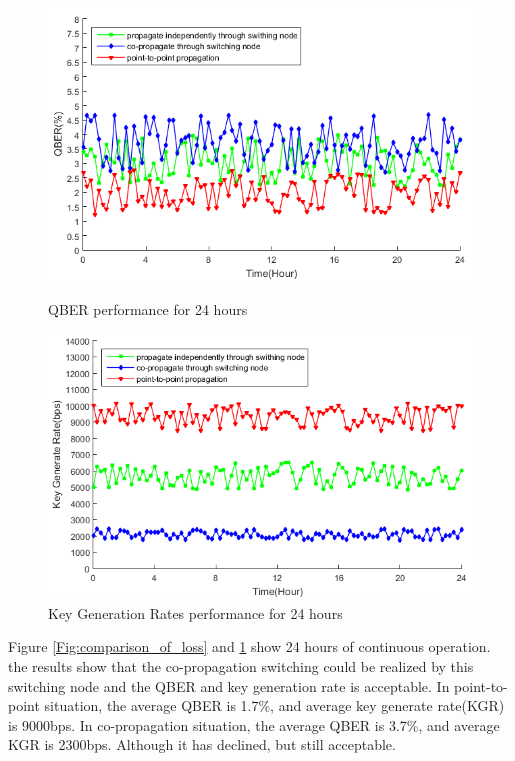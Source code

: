 \documentclass[letterpaper,10pt]{article}
\begin{document}
\begin{figure}[!htb]
   \begin{minipage}{0.48\textwidth}
     \centering
     \includegraphics[width=.9\linewidth]{qber_experiment}
     \caption{QBER performance for 24 hours} \label{Fig:comparison_of_loss}
   \end{minipage}\hfill
   \begin{minipage}{0.48\textwidth}
     \centering
     \includegraphics[width=.9\linewidth]{key_rate_experiment}
     \caption{Key Generation Rates performance for 24 hours} \label{Fig:comparison_of_rate}
   \end{minipage}
\end{figure}
Figure \ref{Fig:comparison_of_loss} and \ref{Fig:comparison_of_rate} show 24 hours of continuous operation. the results show that the co-propagation switching could be realized by this switching node and the QBER and key generation rate is acceptable. In point-to-point situation, the average QBER is 1.7\%, and average key generate rate(KGR) is 9000bps. In co-propagation situation, the average QBER is 3.7\%, and average KGR is 2300bps. Although it has declined, but still acceptable.
\end{document}
